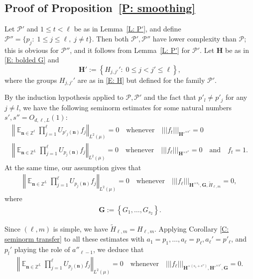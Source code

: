 \documentclass[11pt]{amsart}
\theoremstyle{definition}
\DeclareMathOperator*{\E}{\mathbb{E}}
\newcommand{\Z}{{\mathbb Z}}
\newcommand{\CP}{{\mathcal P}}
\newcommand{\bn}{{\mathbf{n}}}
\newcommand{\norm}[1]{\left\Vert #1\right\Vert}
\newcommand{\nnorm}[1]{\lvert\!|\!| #1|\!|\!\rvert}
\newcommand{\1}{{\mathbf{1}}}
\newcommand{\rem}[1]{\left \{ #1 \right \}}
\begin{document}
\subsection{Proof of Proposition~\ref{P: smoothing}}
Let $\CP'$ and $1\leq t< \ell$ be as in Lemma~\ref{L: P'}, and define $\CP''=\{p_j\colon\; 1\leq j\leq \ell,\; j\neq t\}$. Then both $\CP', \CP''$ have lower complexity than $\CP$; this is obvious for $\CP''$, and it follows from Lemma~\ref{L: P'} for $\CP'$. Let $\mathbf{H}$ be as in \eqref{E: bolded G}  and $$\mathbf{H'}:=\rem{H_{j,j'}'\colon\; 0\leq j<j'\leq \ell},$$ where the groups $H_{j,{j'}}'$ are as in \eqref{E: H} but defined for the family $\CP'$.

By the induction hypothesis applied to $\CP, \CP'$ and the fact that $p'_l\neq p'_j$ for any $j\neq l$, we have the following seminorm estimates for some natural numbers $s',s''=O_{d,\ell,L}(1)$:
\begin{gather*}
    \norm{\E_{\bn\in\Z^\ell}\prod_{j=1}^\ell U_{p'_j(\bn)}f_j}_{L^2(\mu)} = 0\quad \textrm{whenever}\quad \nnorm{f_t}_{\mathbf{H'}^{\times s'}} = 0\\
    \norm{\E_{\bn\in\Z^{L}}\prod_{j=1}^\ell U_{p_j(\bn)}f_j}_{L^2(\mu)} = 0\quad \textrm{whenever}\quad \nnorm{f_\ell}_{\mathbf{H}^{\times s''}} = 0 \quad\textrm{and}\quad f_t =1.
\end{gather*}
At the same time, our assumption gives that
\begin{align}\label{E: assumed estimate}
    \norm{\E_{\bn\in\Z^L}\prod_{j=1}^\ell U_{p_j(\bn)}f_j}_{L^2(\mu)} = 0\quad \textrm{whenever}\quad \nnorm{f_\ell}_{\mathbf{H}^{\times s_1}, \mathbf{G}, \tilde H_{\ell,m}} =0,
\end{align}
where 
\begin{align*}
    \mathbf{G} := \rem{G_1, \ldots, G_{s_2}}.
\end{align*}

Since $(\ell,m)$ is simple, we have $\tilde H_{\ell, m} = H_{\ell,m}$.
Applying Corollary \ref{C: seminorm transfer} to all these estimates with $a_1 = p_1, \ldots, a_\ell = p_\ell, a_\ell' = p'_\ell$, and $p_l'$ playing the role of $a''_{\ell-1}$, we deduce that
\begin{align}\label{E: pong}
    \norm{\E_{\bn\in\Z^L}\prod_{j=1}^\ell U_{p_j(\bn)}f_j}_{L^2(\mu)} = 0\quad \textrm{whenever}\quad \nnorm{f_\ell}_{\mathbf{H}^{\times (s_1+s'')}, \mathbf{H'}^{\times s'}, \mathbf{G}}=0.
\end{align}
\end{document}
